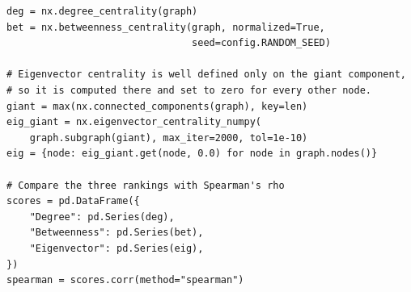 \begin{lstlisting}[style=python]
deg = nx.degree_centrality(graph)
bet = nx.betweenness_centrality(graph, normalized=True,
                                seed=config.RANDOM_SEED)

# Eigenvector centrality is well defined only on the giant component,
# so it is computed there and set to zero for every other node.
giant = max(nx.connected_components(graph), key=len)
eig_giant = nx.eigenvector_centrality_numpy(
    graph.subgraph(giant), max_iter=2000, tol=1e-10)
eig = {node: eig_giant.get(node, 0.0) for node in graph.nodes()}

# Compare the three rankings with Spearman's rho
scores = pd.DataFrame({
    "Degree": pd.Series(deg),
    "Betweenness": pd.Series(bet),
    "Eigenvector": pd.Series(eig),
})
spearman = scores.corr(method="spearman")
\end{lstlisting}
